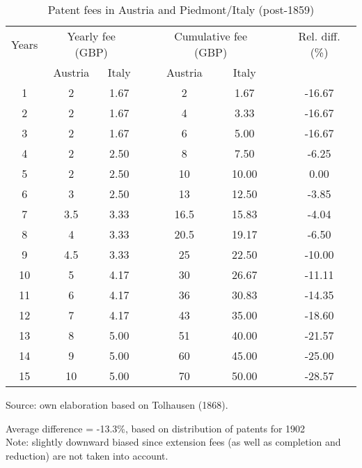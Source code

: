 \begin{table}[!h]
\caption{\label{tab:pat_fees} Patent fees in Austria and Piedmont/Italy (post-1859)}
\centering
\scriptsize

    \begin{tabular}{cccccccc}
        \hline
        Years & \multicolumn{2}{c}{Yearly fee (GBP)} &   & \multicolumn{2}{c}{Cumulative fee (GBP)} &   & Rel. diff. (\%) \\
        \cline{2-3}\cline{5-6}  & Austria & Italy &   & Austria & Italy &   &  \\
        \hline
        1 & 2 & 1.67 &   & 2 & 1.67 &   & -16.67 \\
        2 & 2 & 1.67 &   & 4 & 3.33 &   & -16.67 \\
        3 & 2 & 1.67 &   & 6 & 5.00 &   & -16.67 \\
        4 & 2 & 2.50 &   & 8 & 7.50 &   & -6.25 \\
        5 & 2 & 2.50 &   & 10 & 10.00 &   & 0.00 \\
        6 & 3 & 2.50 &   & 13 & 12.50 &   & -3.85 \\
        7 & 3.5 & 3.33 &   & 16.5 & 15.83 &   & -4.04 \\
        8 & 4 & 3.33 &   & 20.5 & 19.17 &   & -6.50 \\
        9 & 4.5 & 3.33 &   & 25 & 22.50 &   & -10.00 \\
        10 & 5 & 4.17 &   & 30 & 26.67 &   & -11.11 \\
        11 & 6 & 4.17 &   & 36 & 30.83 &   & -14.35 \\
        12 & 7 & 4.17 &   & 43 & 35.00 &   & -18.60 \\
        13 & 8 & 5.00 &   & 51 & 40.00 &   & -21.57 \\
        14 & 9 & 5.00 &   & 60 & 45.00 &   & -25.00 \\
        15 & 10 & 5.00 &   & 70 & 50.00 &   & -28.57 \\
        \hline
    \end{tabular}%
        
    Source: own elaboration based on Tolhausen (1868).

\smallskip
\raggedright Average difference = -13.3\%, based on distribution of patents for 1902 \\
Note: slightly downward biased since extension fees (as well as completion and reduction) are not taken into account.
    
\end{table}